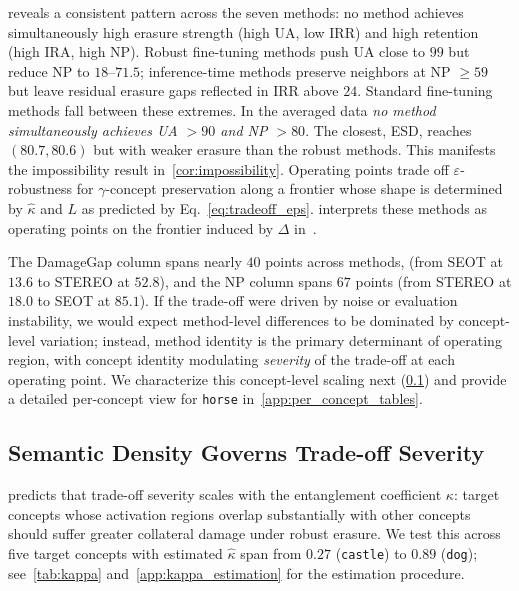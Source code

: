  reveals a consistent pattern across the seven methods: no method achieves simultaneously high erasure strength (high UA, low IRR) and high retention (high IRA, high NP). Robust fine-tuning methods push UA close to $99$ but reduce NP to $18$--$71.5$; inference-time methods preserve neighbors at NP $\geq 59$ but leave residual erasure gaps reflected in IRR above $24$. Standard fine-tuning methods fall between these extremes. 
In the averaged data \emph{no method simultaneously achieves UA $> 90$ and NP $> 80$}. The closest, ESD, reaches $(80.7, 80.6)$ but with weaker erasure than the robust methods. This manifests the impossibility result in~\cref{cor:impossibility}. 
Operating points trade off $\varepsilon$-robustness for $\gamma$-concept preservation along a frontier whose shape is determined by $\hat\kappa$ and $L$ as predicted by Eq.~\eqref{eq:tradeoff_eps}.
 interprets these methods as operating points on the frontier induced by $\Delta$ in~.

The DamageGap column spans nearly $40$ points across methods, (from SEOT at $13.6$ to STEREO at $52.8$), and the NP column spans $67$ points (from STEREO at $18.0$ to SEOT at $85.1$). If the trade-off were driven by noise or evaluation instability, we would expect method-level differences to be dominated by concept-level variation; instead, method identity is the primary determinant of operating region, with concept identity modulating \emph{severity} of the trade-off at each operating point. We characterize this concept-level scaling next (\cref{subsec:kappa_scaling}) and provide a detailed per-concept view for \texttt{horse} in~\cref{app:per_concept_tables}.


\subsection{Semantic Density Governs Trade-off Severity}
\label{subsec:kappa_scaling}
 predicts that trade-off severity scales with the entanglement coefficient $\kappa$: target concepts whose activation regions overlap substantially with other concepts should suffer greater collateral damage under robust erasure. We test this across five target concepts with estimated $\hat\kappa$ span from $0.27$ (\texttt{castle}) to $0.89$ (\texttt{dog}); see~\cref{tab:kappa} and~\cref{app:kappa_estimation} for the estimation procedure. 

